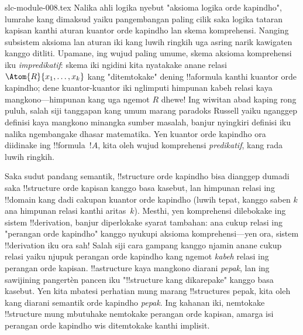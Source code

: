 \begin{filecontents*}[overwrite]{slc-module-008.tex}
Nalika ahli logika nyebut "aksioma logika
orde kapindho", lumrahe kang dimaksud
yaiku pangembangan paling cilik saka
logika tataran kapisan kanthi aturan kuantor
orde kapindho lan skema komprehensi.
Nanging subsistem aksioma lan aturan iki
kang luwih ringkih uga asring narik
kawigaten kanggo ditliti. Upamane,
ing wujud paling umume, skema aksioma
komprehensi iku \emph{impredikatif}:
skema iki ngidini kita nyatakake anane
relasi $\Atom{R}{x_1, \dots, x_k}$
kang "ditemtokake" dening !!a{formula}
kanthi kuantor orde kapindho; dene
kuantor-kuantor iki nglimputi himpunan
kabeh relasi kaya mangkono---himpunan
kang uga ngemot $R$ dhewe!{}
Ing wiwitan abad kaping rong puluh,
salah siji tanggapan kang umum marang
paradoks Russell yaiku nganggep
definisi kaya mangkono minangka
sumber masalah, banjur nyingkiri
definisi iku nalika ngembangake
dhasar matematika. Yen kuantor
orde kapindho ora diidinake ing
!!{formula}~$!A$, kita oleh
wujud komprehensi {\em predikatif},
kang rada luwih ringkih.

Saka sudut pandang semantik,
!!{structure} orde kapindho bisa
dianggep dumadi saka !!{structure}
orde kapisan kanggo basa kasebut,
lan himpunan relasi ing !!{domain}
kang dadi cakupan kuantor orde
kapindho (luwih tepat, kanggo
saben $k$ ana himpunan relasi
kanthi aritas~$k$). Mesthi,
yen komprehensi dilebokake ing
sistem !!{derivation}, banjur
diperlokake syarat tambahan:
ana cukup relasi ing "perangan
orde kapindho" kanggo nyukupi
aksioma komprehensi---yen ora,
sistem !!{derivation} iku ora sah!{}
Salah siji cara gampang kanggo
njamin anane cukup relasi yaiku
njupuk perangan orde kapindho
kang ngemot \emph{kabeh} relasi
ing perangan orde kapisan.
!!a{structure} kaya mangkono
diarani \emph{pepak}, lan ing
sawijining pangertèn pancen
iku "!!{structure} kang dikarepake"
kanggo basa kasebut. Yen kita
mbatesi perhatian mung marang
!!{structure}s pepak, kita
oleh kang diarani semantik
orde kapindho \emph{pepak}.
Ing kahanan iki, nemtokake
!!{structure} mung mbutuhake
nemtokake perangan orde kapisan,
amarga isi perangan orde kapindho
wis ditemtokake kanthi implisit.


\end{filecontents*}

